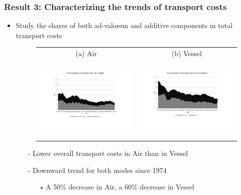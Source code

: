 \documentclass[10 pt,Helvetica, french]{beamer}
\begin{document}
\begin{frame}[label = slide_fig1]
\frametitle{Result 3: Characterizing the trends of transport costs }
\begin{itemize}
\item Study the shares of both ad-valorem and additive components in total transport costs  \hyperlink{slide_result2}{} \hyperlink{slide_comment_compositioneffects}{}
\begin{figure}[htbp]
\begin{center}
\begin{tabular}{cc}
{\scriptsize (a) Air } & {\scriptsize  (b) Vessel}\\
\includegraphics[width=5cm, height=4cm]{Fig2a_decompTC_air_3d.pdf}
& \includegraphics[width=5cm,height=4cm]{Fig2b_decompTC_vessel_3d.pdf} \\
\end{tabular}\end{center}
\end{figure}
\begin{itemize}
\item[-] Lower overall transport costs in Air than in Vessel \vspace{0.1cm}
\item[-] Downward trend for both modes since 1974 \hyperlink{app_fig1}{}\vspace{0.1cm}
\begin{itemize}
\item[$\star$] A 50\% decrease in Air, a 60\% decrease in Vessel \vspace{0.1cm}
\end{itemize}
\end{itemize}
\end{itemize}
\end{frame}
\end{document}
